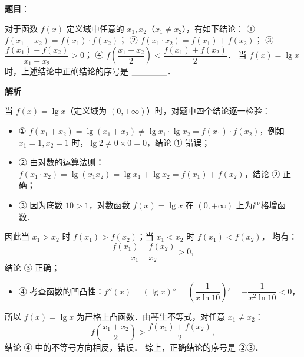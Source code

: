 \begin{answer}

\textbf{题目}：

对于函数 $f(x)$ 定义域中任意的 $x_1, x_2$（$x_1 \neq x_2$），有如下结论：
① $f(x_1 + x_2) = f(x_1) \cdot f(x_2)$；
② $f(x_1 \cdot x_2) = f(x_1) + f(x_2)$；
③ $\dfrac{f(x_1) - f(x_2)}{x_1 - x_2} > 0$；
④ $f\left(\dfrac{x_1 + x_2}{2}\right) < \dfrac{f(x_1) + f(x_2)}{2}$．
当 $f(x) = \lg x$ 时，上述结论中正确结论的序号是 $\underline{\hspace{1.5cm}}$．

\textbf{解析}

当 $f(x) = \lg x$（定义域为 $(0, +\infty)$）时，对题中四个结论逐一检验：
\begin{itemize}
\item ① $f(x_1 + x_2) = \lg(x_1 + x_2) \neq \lg x_1 \cdot \lg x_2 = f(x_1) \cdot f(x_2)$，例如 $x_1 = 1, x_2 = 1$ 时，$\lg 2 \neq 0 \times 0 = 0$，结论 ① 错误；
\item ② 由对数的运算法则：$f(x_1 \cdot x_2) = \lg(x_1 x_2) = \lg x_1 + \lg x_2 = f(x_1) + f(x_2)$，结论 ② 正确；
\item ③ 因为底数 $10 > 1$，对数函数 $f(x) = \lg x$ 在 $(0, +\infty)$ 上为严格增函数．
\end{itemize}
  因此当 $x_1 > x_2$ 时 $f(x_1) > f(x_2)$；当 $x_1 < x_2$ 时 $f(x_1) < f(x_2)$，
  均有：
\nopagebreak[4]
\[\frac{f(x_1) - f(x_2)}{x_1 - x_2} > 0,\]
  结论 ③ 正确；
\begin{itemize}
\item ④ 考查函数的凹凸性：$f''(x) = (\lg x)'' = \left(\dfrac{1}{x\ln 10}\right)' = -\dfrac{1}{x^2\ln 10} < 0$，
\end{itemize}
  所以 $f(x) = \lg x$ 为严格上凸函数．由琴生不等式，对任意 $x_1 \neq x_2$：
\nopagebreak[4]
\[f\left(\frac{x_1 + x_2}{2}\right) > \frac{f(x_1) + f(x_2)}{2},\]
  结论 ④ 中的不等号方向相反，错误．
综上，正确结论的序号是 ②③．


\end{answer}
